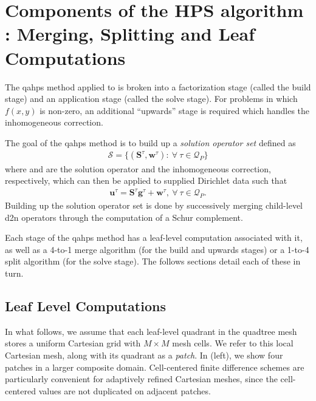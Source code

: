 \section{Components of the HPS algorithm : Merging, Splitting and Leaf Computations}
\label{sec:quadtree}

The \gls{qahps} method applied to  is broken into a factorization stage (called the build stage) and an application stage (called the solve stage). For problems in which $f(x,y)$ is non-zero, an additional ``upwards'' stage is required which handles the inhomogeneous correction.

The goal of the \gls{qahps} method is to build up a {\em solution operator set} defined as
\begin{align}
    \mathcal{S} = \{(\textbf{S}^{\tau}, \textbf{w}^{\tau}) : \ \forall\ \tau \in \mathcal{Q}_P\}
    \label{eq:solution-operator-set}
\end{align}
where \Stau and \wtau are the solution operator and the inhomogeneous correction, respectively, which can then be applied to supplied Dirichlet data \gtau such that
\begin{align}
    \textbf{u}^{\tau} = \textbf{S}^{\tau} \textbf{g}^{\tau} + \textbf{w}^{\tau},\ \forall\ \tau \in \mathcal{Q}_P.
    \label{eq:u-Sg-w}
\end{align}
Building up the solution operator set is done by successively merging child-level \gls{d2n} operators \Ttau through the computation of a Schur complement.

Each stage of the \gls{qahps} method has a leaf-level computation associated with it, as well as a 4-to-1 merge algorithm (for the build and upwards stages) or a 1-to-4 split algorithm (for the solve stage). The follows sections detail each of these in turn.

\subsection{Leaf Level Computations}
\label{sub:leaf_level_computations}

In what follows, we assume that each leaf-level quadrant in the quadtree mesh stores a uniform Cartesian grid with $M \times M$ mesh cells.  We refer to this local Cartesian mesh, along with its quadrant as a {\em patch}.  In  (left), we show four patches in a larger composite domain. Cell-centered finite difference schemes are particularly convenient for adaptively refined Cartesian meshes, since the cell-centered values are not duplicated on adjacent patches.

